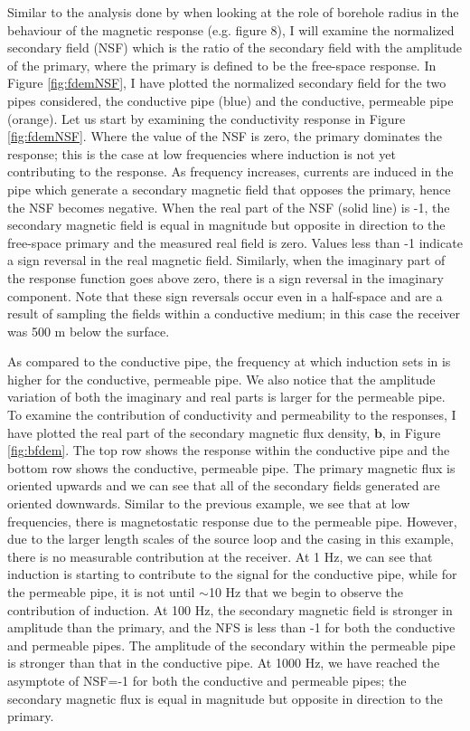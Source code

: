 Similar to the analysis done by \cite{Augustin1989} when looking at the role of borehole radius in the behaviour of the magnetic response (e.g. figure 8), I will examine the normalized secondary field (NSF) which is the ratio of the secondary field with the amplitude of the primary, where the primary is defined to be the free-space response. In Figure \ref{fig:fdemNSF}, I have plotted the normalized secondary field for the two pipes considered, the conductive pipe (blue) and the conductive, permeable pipe (orange). Let us start by examining the conductivity response in Figure \ref{fig:fdemNSF}. Where the value of the NSF is zero, the primary dominates the response; this is the case at low frequencies where induction is not yet contributing to the response. As frequency increases, currents are induced in the pipe which generate a secondary magnetic field that opposes the primary, hence the NSF becomes negative. When the real part of the NSF (solid line) is -1, the secondary magnetic field is equal in magnitude but opposite in direction to the free-space primary and the measured real field is zero. Values less than -1 indicate a sign reversal in the real magnetic field. Similarly, when the imaginary part of the response function goes above zero, there is a sign reversal in the imaginary component. Note that these sign reversals occur even in a half-space and are a result of sampling the fields within a conductive medium; in this case the receiver was 500 m below the surface.

As compared to the conductive pipe, the frequency at which induction sets in is higher for the conductive, permeable pipe. We also notice that the amplitude variation of both the imaginary and real parts is larger for the permeable pipe. To examine the contribution of conductivity and permeability to the responses, I have plotted the real part of the secondary magnetic flux density, $\mathbf{b}$, in Figure \ref{fig:bfdem}. The top row shows the response within the conductive pipe and the bottom row shows the conductive, permeable pipe. The primary magnetic flux is oriented upwards and we can see that all of the secondary fields generated are oriented downwards. Similar to the previous example, we see that at low frequencies, there is magnetostatic response due to the permeable pipe. However, due to the larger length scales of the source loop and the casing in this example, there is no measurable contribution at the receiver. At 1 Hz, we can see that induction is starting to contribute to the signal for the conductive pipe, while for the permeable pipe, it is not until $\sim$10 Hz that we begin to observe the contribution of induction. At 100 Hz, the secondary magnetic field is stronger in amplitude than the primary, and the NFS is less than -1 for both the conductive and permeable pipes. The amplitude of the secondary within the permeable pipe is stronger than that in the conductive pipe. At 1000 Hz, we have reached the asymptote of NSF=-1 for both the conductive and permeable pipes; the secondary magnetic flux is equal in magnitude but opposite in direction to the primary.

